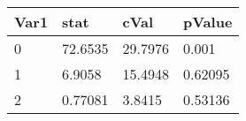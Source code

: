 \begin{tabular}{llll}
\toprule 
Var1 & stat & cVal & pValue \\ 
\midrule 
0 & 72.6535 & 29.7976 & 0.001 \\ 
1 & 6.9058 & 15.4948 & 0.62095 \\ 
2 & 0.77081 & 3.8415 & 0.53136 \\ 
\bottomrule 
\end{tabular}